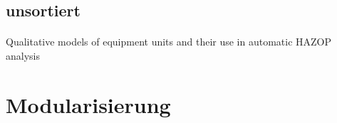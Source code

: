 \subsection{unsortiert}
\paragraph*{\cite{Bartolozzi_2000}} Qualitative models of equipment units and their use in automatic {HAZOP} analysis

\subsubsection{\cite{Kavcic_2001}}









\section{Modularisierung}
